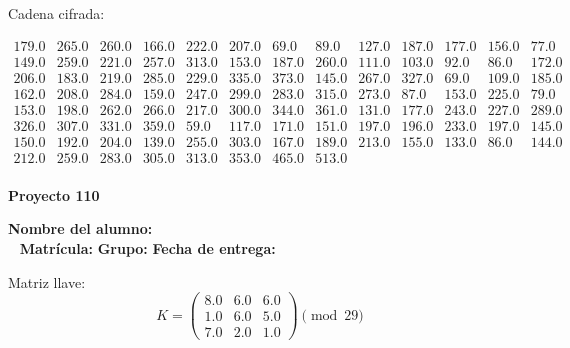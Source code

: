 \documentclass[12pt]{article}
\begin{document}
Cadena cifrada:
\begin{center}
$\begin{array}{lllllllllllll}
179.0 & 265.0 & 260.0 & 166.0 & 222.0 & 207.0 & 69.0 & 89.0 & 127.0 & 187.0 & 177.0 & 156.0 & 77.0\\
149.0 & 259.0 & 221.0 & 257.0 & 313.0 & 153.0 & 187.0 & 260.0 & 111.0 & 103.0 & 92.0 & 86.0 & 172.0\\
206.0 & 183.0 & 219.0 & 285.0 & 229.0 & 335.0 & 373.0 & 145.0 & 267.0 & 327.0 & 69.0 & 109.0 & 185.0\\
162.0 & 208.0 & 284.0 & 159.0 & 247.0 & 299.0 & 283.0 & 315.0 & 273.0 & 87.0 & 153.0 & 225.0 & 79.0\\
153.0 & 198.0 & 262.0 & 266.0 & 217.0 & 300.0 & 344.0 & 361.0 & 131.0 & 177.0 & 243.0 & 227.0 & 289.0\\
326.0 & 307.0 & 331.0 & 359.0 & 59.0 & 117.0 & 171.0 & 151.0 & 197.0 & 196.0 & 233.0 & 197.0 & 145.0\\
150.0 & 192.0 & 204.0 & 139.0 & 255.0 & 303.0 & 167.0 & 189.0 & 213.0 & 155.0 & 133.0 & 86.0 & 144.0\\
212.0 & 259.0 & 283.0 & 305.0 & 313.0 & 353.0 & 465.0 & 513.0\\
\end{array}$
\end{center}

\newpage


\textbf{Proyecto 110}

\textbf{Nombre del alumno:} \underline{\hspace{13cm}}\\\
\vspace{1cm}
\textbf{Matrícula:} \underline{\hspace{4cm}} \hspace{1cm}
\textbf{Grupo:} \underline{\hspace{2cm}}
\textbf{Fecha de entrega:} \underline{\hspace{2cm}}

\medskip

Matriz llave:
\[
K = \begin{pmatrix}
8.0 & 6.0 & 6.0\\
1.0 & 6.0 & 5.0\\
7.0 & 2.0 & 1.0
\end{pmatrix} \pmod{29}
\]
\end{document}

